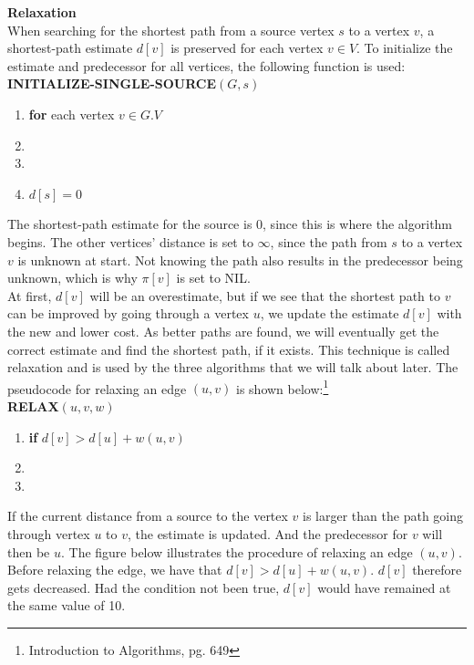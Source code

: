 \documentclass[11pt]{article}
\begin{document}
\noindent
\textbf{Relaxation}\\
When searching for the shortest path from a source vertex $s$ to a
vertex $v$, a shortest-path estimate $d[v]$ is preserved for each
vertex $v \in V$. To initialize the estimate and predecessor for all vertices, the following function is used:\\

\textbf{INITIALIZE-SINGLE-SOURCE$(G, s)$}
\begin{enumerate}
\setlength\itemsep{0em}
\item \textbf{for } each vertex $v \in G.V$
\item {}
\item {}
\item $d[s] = 0$
\end{enumerate}
The shortest-path estimate for the source is 0, since this is where the algorithm begins. The other vertices' distance is set to $\infty$, since the path from $s$ to a vertex $v$ is unknown at start. Not knowing the path also results in the predecessor being unknown, which is why $\pi[v]$ is set to NIL.\\
At first, $d[v]$ will be an overestimate, but if we see that the shortest path to $v$ can be improved by going through a vertex $u$, we update the estimate $d[v]$ with the new and lower cost. As better paths are found, we will eventually get the correct estimate and find the shortest path, if it exists. This technique is called relaxation and is used by the three algorithms that we will talk about later. The pseudocode for relaxing an edge $(u,v) $ is shown below:\footnote{Introduction to Algorithms, pg. 649}\\

\textbf{RELAX$(u, v, w)$}
\begin{enumerate}
\setlength\itemsep{0em}
\item \textbf{if } $d[v] > d[u] + w(u,v)$
\item {}
\item {}
\end{enumerate}
If the current distance from a source to the vertex $v$ is larger than the path going through vertex $u$ to $v$, the estimate is updated. And the predecessor for $v$ will then be $u$. The figure below illustrates the procedure of relaxing an edge $(u,v)$. Before relaxing the edge, we have that $d[v] > d[u] + w(u,v)$. $d[v]$ therefore gets decreased. Had the condition not been true, $d[v]$ would have remained at the same value of 10. 
\end{document}
